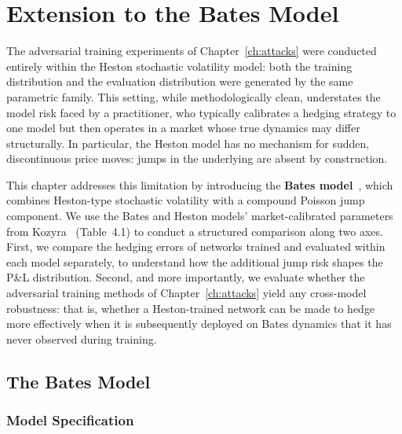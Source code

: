 
\chapter{Extension to the Bates Model}
\label{ch:bates}

The adversarial training experiments of
Chapter~\ref{ch:attacks} were conducted entirely within the Heston
stochastic volatility model: both the training distribution and the
evaluation distribution were generated by the same parametric family.
This setting, while methodologically clean, understates the model risk
faced by a practitioner, who typically calibrates a hedging strategy to
one model but then operates in a market whose true dynamics may differ
structurally. In particular, the Heston model has no mechanism for
sudden, discontinuous price moves: jumps in the underlying are absent by
construction.

This chapter addresses this limitation by introducing the \textbf{Bates
model}~\citep{bates1996}, which combines Heston-type stochastic
volatility with a compound Poisson jump component. We use the Bates and
Heston models' market-calibrated parameters from Kozyra~\citep{kozyra2006}
(Table~4.1) to conduct a structured comparison along two axes. First, we
compare the hedging errors of networks trained and evaluated within each
model separately, to understand how the additional jump risk shapes the
P\&L distribution. Second, and more importantly, we evaluate whether the
adversarial training methods of Chapter~\ref{ch:attacks} yield any
cross-model robustness: that is, whether a Heston-trained network can
be made to hedge more effectively when it is subsequently deployed on
Bates dynamics that it has never observed during training.

\section{The Bates Model}
\label{sec:bates_model}

\subsection{Model Specification}
\label{sec:bates_spec}

